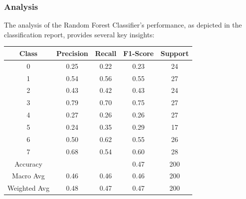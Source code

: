 \documentclass[twocolumn]{article}[ht]
\begin{document}
\subsubsection{Analysis}
The analysis of the Random Forest Classifier's performance, as depicted in the classification report, provides several key insights:
\begin{center}
    \small
    \begin{tabular}{|c|c|c|c|c|}
    \hline
    Class & Precision & Recall & F1-Score & Support \\
    \hline
    0 & 0.25 & 0.22 & 0.23 & 24 \\
    1 & 0.54 & 0.56 & 0.55 & 27 \\
    2 & 0.43 & 0.42 & 0.43 & 24 \\
    3 & 0.79 & 0.70 & 0.75 & 27 \\
    4 & 0.27 & 0.26 & 0.26 & 27 \\
    5 & 0.24 & 0.35 & 0.29 & 17 \\
    6 & 0.50 & 0.62 & 0.55 & 26 \\
    7 & 0.68 & 0.54 & 0.60 & 28 \\
    \hline
    Accuracy & & & 0.47 & 200 \\
    \hline
    Macro Avg & 0.46 & 0.46 & 0.46 & 200 \\
    Weighted Avg & 0.48 & 0.47 & 0.47 & 200 \\
    \hline
    \end{tabular}
\end{center}
\end{document}
